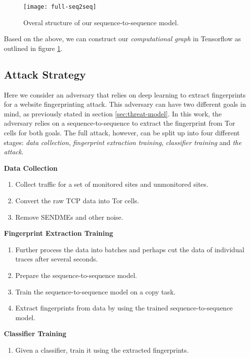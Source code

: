 \begin{figure}[ht]
  \centering
  \texttt{[image: full-seq2seq]}
  \caption{Overal structure of our sequence-to-sequence model.}
  \label{fig:full-seq2seq}
\end{figure}

Based on the above, we can construct our \textit{computational graph} in Tensorflow as outlined in figure \ref{fig:full-seq2seq}.

\newpage

\subsection{Attack Strategy}

Here we consider an adversary that relies on deep learning to extract fingerprints for a website fingerprinting attack.
This adversary can have two different goals in mind, as previously stated in section \ref{sec:threat-model}.
In this work, the adversary relies on a sequence-to-sequence to extract the fingerprint from Tor cells for both goals.
The full attack, however, can be split up into four different stages: \textit{data collection}, \textit{fingerprint extraction training}, \textit{classifier training} and \textit{the attack}.

\noindent
\textbf{Data Collection}
\begin{enumerate}
  \item Collect traffic for a set of monitored sites and unmonitored sites.
  \item Convert the raw TCP data into Tor cells.
  \item Remove SENDMEs and other noise.
\end{enumerate}

\noindent
\textbf{Fingerprint Extraction Training}
\begin{enumerate}[resume]
  \item Further process the data into batches and perhaps cut the data of individual traces after several seconds.
  \item Prepare the sequence-to-sequence model.
  \item Train the sequence-to-sequence model on a copy task.
  \item Extract fingerprints from data by using the trained sequence-to-sequence model.
\end{enumerate}

\noindent
\textbf{Classifier Training}
\begin{enumerate}[resume]
  \item Given a classifier, train it using the extracted fingerprints.
\end{enumerate}

